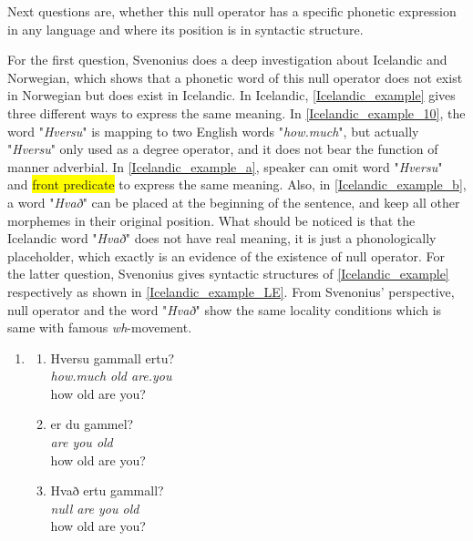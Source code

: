 \documentclass{ctexart}
\begin{document}
Next questions are, whether this null operator has a specific phonetic expression in any language and where its position is in syntactic structure. 

For the first question, Svenonius does a deep investigation about Icelandic and Norwegian, which shows that a phonetic word of this null operator does not exist in Norwegian but does exist in Icelandic. In Icelandic, \ref{Icelandic_example} gives three different ways to express the same meaning. In \ref{Icelandic_example_10}, the word "\textit{Hversu}" is mapping to two English words "\textit{how.much}", but actually "\textit{Hversu}" only used as a degree operator, and it does not bear the function of manner adverbial. In \ref{Icelandic_example_a}, speaker can omit word "\textit{Hversu}" and \colorbox{yellow}{front predicate} to express the same meaning. Also, in \ref{Icelandic_example_b}, a word "\textit{Hvað}" can be placed at the beginning of the sentence, and keep all other morphemes in their original position. What should be noticed is that the Icelandic word "\textit{Hvað}" does not have real meaning, it is just a phonologically placeholder, which exactly is an evidence of the existence of null operator. For the latter question, Svenonius gives syntactic structures of \ref{Icelandic_example} respectively as shown in \ref{Icelandic_example_LE}. From Svenonius' perspective, null operator and the word "\textit{Hvað}" show the same locality conditions which is same with famous \textit{wh}-movement. 

\begin{enumerate}[resume]
    \item \label{Icelandic_example}
    
    \begin{enumerate}[ref=(\arabic{enumi}\alph*)]
        \item \label{Icelandic_example_10}
        Hversu gammall ertu? \\
        \textit{how.much old are.you} \\
        how old are you?

        \item \label{Icelandic_example_a}
        er du gammel? \\
        \textit{are you old} \\
        how old are you?

        \item \label{Icelandic_example_b}
        Hvað ertu gammall? \\
        \textit{null are you old} \\
        how old are you?

    \end{enumerate}   
    
\end{enumerate}
\end{document}

